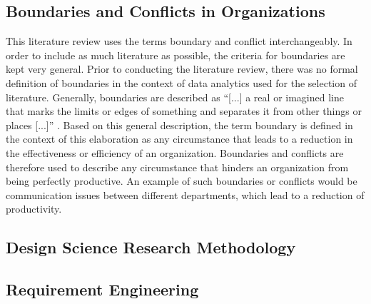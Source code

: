 \subsection{Boundaries and Conflicts in Organizations}

This literature review uses the terms boundary and conflict interchangeably. In order to include as much literature as possible, the criteria for boundaries are kept very general. Prior to conducting the literature review, there was no formal definition of boundaries in the context of data analytics used for the selection of literature. Generally, boundaries are described as \enquote{[...] a real or imagined line that marks the limits or edges of something and separates it from other things or places [...]} \parencite{Hornby.2015}. Based on this general description, the term boundary is defined in the context of this elaboration as any circumstance that leads to a reduction in the effectiveness or efficiency of an organization. %
Boundaries and conflicts are therefore used to describe any circumstance that hinders an organization from being perfectly productive. An example of such boundaries or conflicts would be communication issues between different departments, which lead to a reduction of productivity.

\subsection{Design Science Research Methodology}

\subsection{Requirement Engineering}




